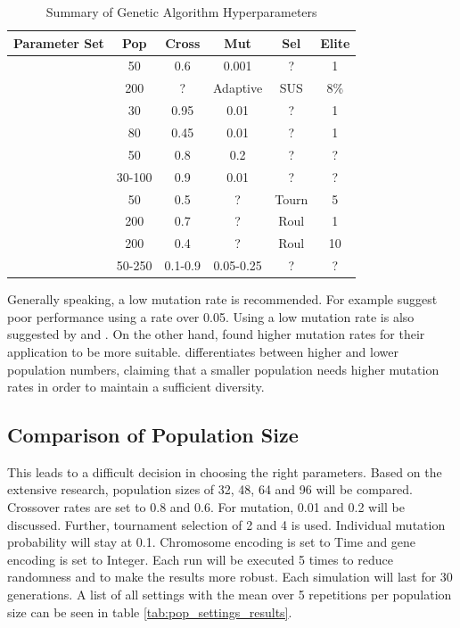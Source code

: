 \begin{table}[h]
	\centering
	\caption{Summary of Genetic Algorithm Hyperparameters}
	\label{tab:ga_hyperparameters}
	\begin{tabular}{lccccc}
		\hline
		\textbf{Parameter Set} & \textbf{Pop} & \textbf{Cross} & \textbf{Mut} & \textbf{Sel} & \textbf{Elite} \\
		\hline
		\cite{de_jong_analysis_1975} & 50 & 0.6 & 0.001 & ? & 1 \\
		\cite{mills_determining_2015} & 200 & ? & Adaptive & SUS & 8\% \\
		\cite{grefenstette_optimization_1986} & 30 & 0.95 & 0.01 & ? & 1 \\
		\cite{grefenstette_optimization_1986} & 80 & 0.45 & 0.01 & ? & 1 \\
		\cite{almanee_scenorita_2021} & 50 & 0.8 & 0.2 & ? & ? \\
		\cite{srinivas_genetic_1994}  & 30-100 & 0.9 & 0.01 & ? & ? \\
		\cite{fazal_estimating_2005} & 50 & 0.5 & ? & Tourn & 5 \\
		\cite{dao_maximising_2016} & 200 & 0.7 & ? & Roul & 1 \\
		\cite{naruka_parameter_2019} & 200 & 0.4 & ? & Roul & 10 \\
		\cite{jinghui_zhong_comparison_2005} & 50-250 & 0.1-0.9 & 0.05-0.25 & ? & ? \\
		\hline
	\end{tabular}
\end{table}

Generally speaking, a low mutation rate is recommended. For example \cite{grefenstette_optimization_1986} suggest poor performance using a rate over 0.05. Using a low mutation rate is also suggested by \cite{whitley_genetic_1994} and \cite{jinghui_zhong_comparison_2005}. On the other hand, \cite{boyabatli_parameter_2004} found higher mutation rates for their application to be more suitable. \cite{srinivas_genetic_1994} differentiates between higher and lower population numbers, claiming that a smaller population needs higher mutation rates in order to maintain a sufficient diversity.



\subsection{Comparison of Population Size}
This leads to a difficult decision in choosing the right parameters. Based on the extensive research, population sizes of 32, 48, 64 and 96 will be compared. Crossover rates are set to 0.8 and 0.6. For mutation, 0.01 and 0.2 will be discussed. Further, tournament selection of 2 and 4 is used.
Individual mutation probability will stay at 0.1. Chromosome encoding is set to Time and gene encoding is set to Integer. 
Each run will be executed 5 times to reduce randomness and to make the results more robust. Each simulation will last for 30 generations. A list of all settings with the mean over 5 repetitions per population size can be seen in table \ref{tab:pop_settings_results}.

